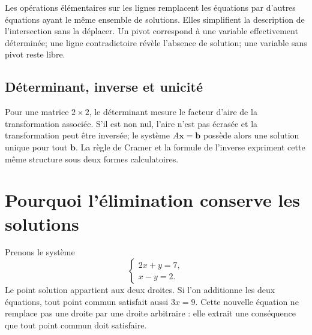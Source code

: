 \documentclass[12pt,a4paper,openany]{book}
\begin{document}
\begin{connectionbox}
Les opérations élémentaires sur les lignes remplacent les équations par d'autres équations ayant le même ensemble de solutions. Elles simplifient la description de l'intersection sans la déplacer. Un pivot correspond à une variable effectivement déterminée; une ligne contradictoire révèle l'absence de solution; une variable sans pivot reste libre.
\end{connectionbox}

\begin{center}
\end{center}

\subsection{Déterminant, inverse et unicité}
Pour une matrice $2\times2$, le déterminant mesure le facteur d'aire de la transformation associée. S'il est non nul, l'aire n'est pas écrasée et la transformation peut être inversée; le système $A\mathbf x=\mathbf b$ possède alors une solution unique pour tout $\mathbf b$. La règle de Cramer et la formule de l'inverse expriment cette même structure sous deux formes calculatoires.


\section{Pourquoi l'élimination conserve les solutions}

Prenons le système
\[
\begin{cases}
2x+y=7,\\
x-y=2.
\end{cases}
\]
Le point solution appartient aux deux droites. Si l'on additionne les deux équations, tout point commun satisfait aussi $3x=9$. Cette nouvelle équation ne remplace pas une droite par une droite arbitraire : elle extrait une conséquence que tout point commun doit satisfaire.
\end{document}
